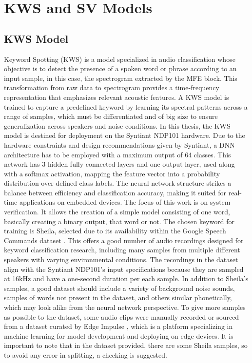 \chapter{KWS and SV Models}
\label{cha:training}
\section{KWS Model}
\label{sec:kws deployment}
Keyword Spotting (KWS) is a model specialized in audio classification whose objective is to detect the presence of a spoken word or phrase according to an input sample, in this case, the spectrogram extracted by the MFE block. This transformation from raw data to spectrogram provides a time-frequency representation that emphasizes relevant acoustic features. A KWS model is trained to capture a predefined keyword by learning its spectral patterns across a range of samples, which must be differentiated and of big size to ensure generalization across speakers and noise conditions.
In this thesis, the KWS model is destined for deployment on the Syntiant NDP101 hardware. Due to the hardware constraints and design recommendations given by Syntiant, a DNN architecture has to be employed with a maximum output of 64 classes\cite{hardware_ndp101}. This network has 3 hidden fully connected layers and one output layer, used along with a softmax activation, mapping the feature vector into a probability distribution over defined class labels. The neural network structure strikes a balance between efficiency and classification accuracy, making it suited for real-time applications on embedded devices.
The focus of this work is on system verification. It allows the creation of a simple model consisting of one word, basically creating a binary output, that word or not. The chosen keyword for training is Sheila, selected due to its availability within the Google Speech Commands dataset \cite{speechcommands}. This offers a good number of audio recordings designed for keyword classification research, including many samples from multiple different speakers with varying environmental conditions.
The recordings in the dataset align with the Syntiant NDP101's input specifications because they are sampled at 16kHz and have a one-second duration per each sample. In addition to Sheila’s samples, a good dataset should include a variety of background noise sounds, samples of words not present in the dataset, and others similar phonetically, which may look alike from the neural network perspective. To give more samples as possible to the dataset, some audio clips were manually recorded or sourced from a dataset curated by Edge Impulse \cite{edgeimpulse_dataset_499022}, which is a platform specializing in machine learning for model development and deploying on edge devices. It is important to note that in the dataset provided, there are some Sheila samples, so to avoid any error in splitting, a checking is suggested.
